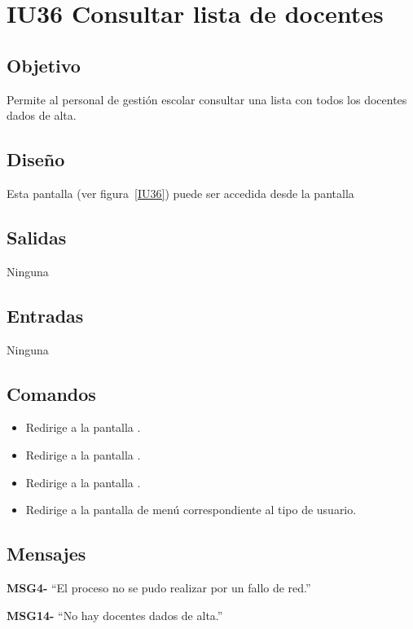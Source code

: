 
\section{IU36 Consultar lista de docentes}
\subsection{Objetivo}
   Permite al personal de gestión escolar consultar una lista con todos los docentes dados de alta.
\subsection{Diseño}
    Esta pantalla  (ver figura~\ref{IU36}) puede ser accedida desde la pantalla 

\subsection{Salidas}
Ninguna
\subsection{Entradas}
Ninguna
\subsection{Comandos}
\begin{itemize}
    \item {} Redirige a la pantalla .
    \item {} Redirige a la pantalla .
    \item {} Redirige a la pantalla .
    \item {} Redirige a la pantalla de menú correspondiente al tipo de usuario.
    
\end{itemize}

\subsection{Mensajes}

\begin{Citemize}
    \item {\bf MSG4-}  ``El proceso no se pudo realizar por un fallo de red.''
    \item {\bf MSG14-}  ``No hay docentes dados de alta.''
\end{Citemize}


